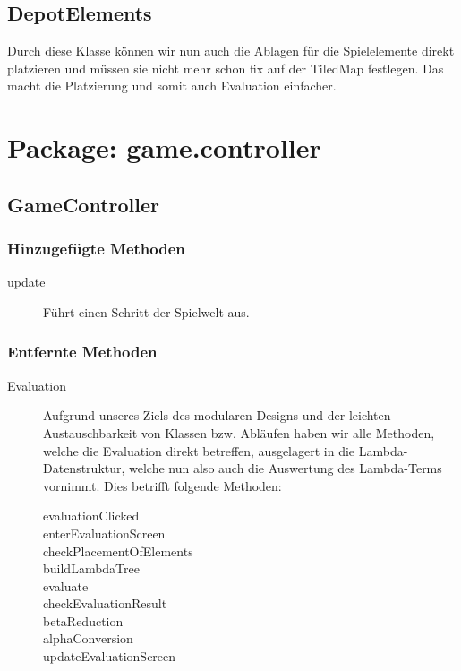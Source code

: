 \documentclass[parskip=full]{scrreprt}
\begin{document}
\subsection{DepotElements}
Durch diese Klasse können wir nun auch die Ablagen für die Spielelemente direkt platzieren und müssen sie nicht mehr schon fix auf der TiledMap festlegen. Das macht die Platzierung und somit auch Evaluation einfacher.

\section{Package: game.controller}

\subsection{GameController}

\subsubsection{Hinzugefügte Methoden}
\begin{description}
	\item[update] Führt einen Schritt der Spielwelt aus.
\end{description}

\subsubsection{Entfernte Methoden}
\begin{description}
	\item[Evaluation] Aufgrund unseres Ziels des modularen Designs und der leichten Austauschbarkeit von Klassen bzw. Abläufen haben wir alle Methoden, welche die Evaluation direkt betreffen, ausgelagert in die Lambda-Datenstruktur, welche nun also auch die Auswertung des Lambda-Terms vornimmt. Dies betrifft folgende Methoden:
		\begin{description}
			\item[evaluationClicked]
			\item[enterEvaluationScreen]
			\item[checkPlacementOfElements]
			\item[buildLambdaTree]
			\item[evaluate]
			\item[checkEvaluationResult]
			\item[betaReduction]
			\item[alphaConversion]
			\item[updateEvaluationScreen]
		\end{description}
	
\end{description}
\end{document}
